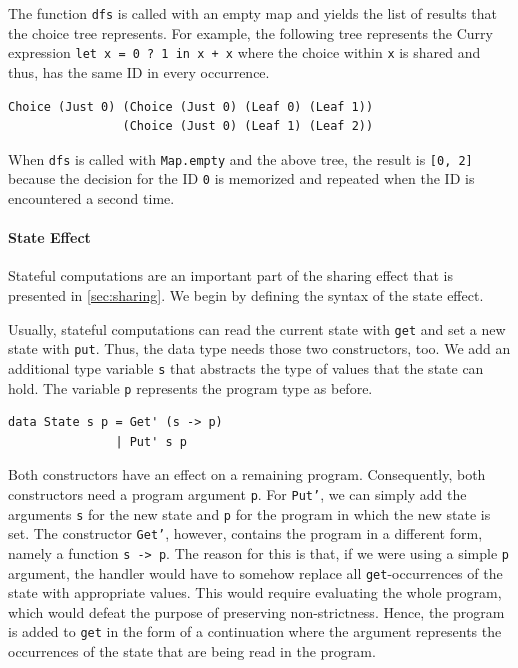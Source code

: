\documentclass[a4paper, 11pt, fleqn, twoside, abstract=on]{scrreprt}
\newcommand{\hinl}[1]{\texttt{#1}}
\begin{document}
The function \hinl{dfs} is called with an empty map and yields the list of results that the choice tree represents.
For example, the following tree represents the Curry expression \hinl{let x = 0 ? 1 in x + x} where the choice within \hinl{x} is shared and thus, has the same ID in every occurrence.

\begin{verbatim}
Choice (Just 0) (Choice (Just 0) (Leaf 0) (Leaf 1)) 
                (Choice (Just 0) (Leaf 1) (Leaf 2))
\end{verbatim}
\noindent
When \hinl{dfs} is called with \hinl{Map.empty} and the above tree, the result is \hinl{[0, 2]} because the decision for the ID \hinl{0} is memorized and repeated when the ID is encountered a second time.

\paragraph{State Effect}
Stateful computations are an important part of the sharing effect that is presented in \autoref{sec:sharing}.
We begin by defining the syntax of the state effect.

Usually, stateful computations can read the current state with \hinl{get} and set a new state with \hinl{put}.
Thus, the data type needs those two constructors, too.
We add an additional type variable \hinl{s} that abstracts the type of values that the state can hold.
The variable \hinl{p} represents the program type as before.

\begin{verbatim}
data State s p = Get' (s -> p)
               | Put' s p
\end{verbatim}

Both constructors have an effect on a remaining program.
Consequently, both constructors need a program argument \hinl{p}.
For \hinl{Put'}, we can simply add the arguments \hinl{s} for the new state and \hinl{p} for the program in which the new state is set.
The constructor \hinl{Get'}, however, contains the program in a different form, namely a function \hinl{s -> p}.
The reason for this is that, if we were using a simple \hinl{p} argument, the handler would have to somehow replace all \hinl{get}-occurrences of the state with appropriate values.
This would require evaluating the whole program, which would defeat the purpose of preserving non-strictness.
Hence, the program is added to \hinl{get} in the form of a continuation where the argument represents the occurrences of the state that are being read in the program.
\end{document}
